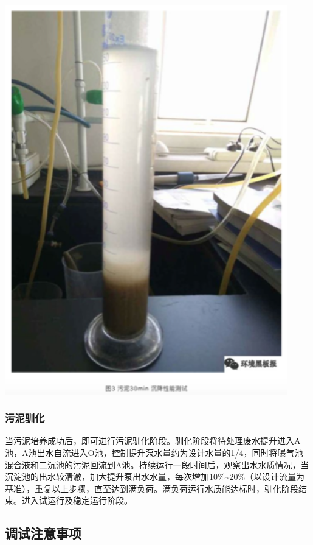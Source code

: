 \documentclass[
]{book}
\begin{document}
\includegraphics[width=4.83in]{images/ao3}

\hypertarget{ux6c61ux6ce5ux9a6fux5316}{%
\subsubsection{污泥驯化}\label{ux6c61ux6ce5ux9a6fux5316}}

当污泥培养成功后，即可进行污泥驯化阶段。驯化阶段将待处理废水提升进入A池，A池出水自流进入O池，控制提升泵水量约为设计水量的1/4，同时将曝气池混合液和二沉池的污泥回流到A池。持续运行一段时间后，观察出水水质情况，当沉淀池的出水较清澈，加大提升泵出水水量，每次增加10\%\textasciitilde20\%（以设计流量为基准），重复以上步骤，直至达到满负荷。满负荷运行水质能达标时，驯化阶段结束。进入试运行及稳定运行阶段。

\hypertarget{ux8c03ux8bd5ux6ce8ux610fux4e8bux9879}{%
\subsection{调试注意事项}\label{ux8c03ux8bd5ux6ce8ux610fux4e8bux9879}}
\end{document}
